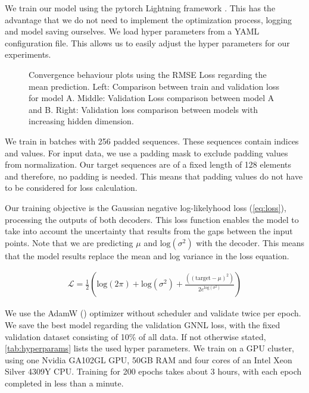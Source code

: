 We train our model using the pytorch Lightning framework \cite{falcon2019pytorch}. This has the advantage that we do not need to implement the optimization process, logging and model saving ourselves. We load hyper parameters from a YAML configuration file. This allows us to easily adjust the hyper parameters for our experiments.

\begin{figure*}
	\centering
	\resizebox{0.9\textwidth}{!}{
		
		
		
	}
	\caption{Convergence behaviour plots using the RMSE Loss regarding the mean prediction. Left: Comparison between train and validation loss for model A. Middle: Validation Loss comparison between model A and B. Right: Validation loss comparison between models with increasing hidden dimension.}
	\label{fig:loss_plot}
\end{figure*}

We train in batches with 256 padded sequences. These sequences contain indices and values. For input data, we use a padding mask to exclude padding values from normalization. Our target sequences are of a fixed length of 128 elements and therefore, no padding is needed. This means that padding values do not have to be considered for loss calculation.

Our training objective is the Gaussian negative log-likelyhood loss (\autoref{eq:loss}), processing the outputs of both decoders. This loss function enables the model to take into account the uncertainty that results from the gaps between the input points. Note that we are predicting $\mu$ and $\text{log} (\sigma^2)$ with the decoder. This means that the model results replace the mean and log variance in the loss equation.

\begin{align}
\mathcal{L} = \frac{1}{2}\left(\text{log}(2\pi) + \text{log}(\sigma^2) + \frac{((\text{target} - \mu)^2)}{2 e^{\text{log}(\sigma^2)}}\right) \label{eq:loss}
\end{align}

We use the AdamW (\citet{loshchilov2017fixing}) optimizer without scheduler and validate twice per epoch. We save the best model regarding the validation GNNL loss, with the fixed validation dataset consisting of 10\% of all data. If not otherwise stated, \autoref{tab:hyperparams} lists the used hyper parameters. We train on a GPU cluster, using one Nvidia GA102GL GPU, 50GB RAM and four cores of an Intel Xeon Silver 4309Y CPU. Training for 200 epochs takes about 3 hours, with each epoch completed in less than a minute.

